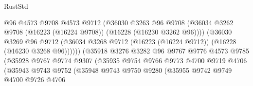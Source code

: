 \begin{lexlean}{RustStd}
\begin{coremodule}
                                      @96
                                      @4573
                                      @9708
                                      @4573
                                      @9712
                                      (@36030
                                        @3263
                                        @96
                                        @9708
                                        (@36034
                                          @3262
                                          @9708
                                          (@16223 (@16224 @9708))
                                          (@16228 (@16230 @3262 @96))))
                                      (@36030
                                        @3269
                                        @96
                                        @9712
                                        (@36034
                                          @3268
                                          @9712
                                          (@16223 (@16224 @9712))
                                          (@16228 (@16230 @3268 @96))))))
                                  (@35918
                                    @3276
                                    @3282
                                    @96
                                    @9767
                                    @9776
                                    @4573
                                    @9785
                                    (@35928
                                      @9767
                                      @9774
                                      @9307
                                      (@35935
                                        @9754
                                        @9766
                                        @9773
                                        @4700
                                        @9719
                                        @4706
                                        (@35943
                                          @9743
                                          @9752
                                          (@35948
                                            @9743
                                            @9750
                                            @9280
                                            (@35955
                                              @9742
                                              @9749
                                              @4700
                                              @9726
                                              @4706

\end{coremodule}
\end{lexlean}
